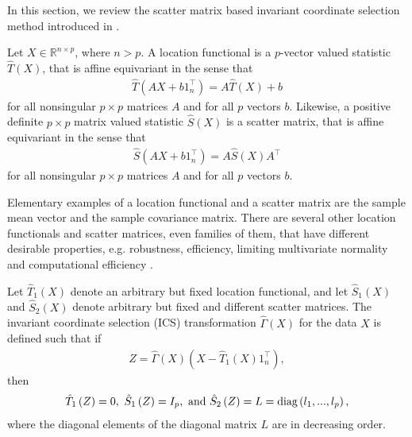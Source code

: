 \documentclass{llncs}
\begin{document}
In this section, we review the scatter matrix based invariant coordinate selection method introduced in \cite{TY}.


Let $X \in \mathbb{R}^{n\times p}$, where $n>p$. A location functional is a $p$-vector valued statistic $\hat{T}\left(X\right)$, that is affine equivariant in the sense that
\begin{align*}
\hat{T}\left(AX+b1_n^\top\right)=A\hat{T}\left(X\right)+b
\end{align*}
for all nonsingular $p\times p$ matrices $A$ and for all $p$ vectors
$b$.
Likewise, a  
positive definite $p\times p$ matrix valued statistic $\hat{S}\left(X\right)$ is a scatter matrix, that is affine
equivariant in the sense that
\begin{align*}
\hat{S}\left(AX+b1_n^\top\right)=A\hat{S}\left(X\right)A^\top
\end{align*}
for all nonsingular $p\times p$ matrices $A$ and for all $p$ vectors
$b$.



Elementary examples of a location functional and a scatter matrix are
the sample mean vector and the sample covariance matrix. There are several other location functionals and scatter matrices, even families of them, that have different desirable properties, e.g. robustness, efficiency, limiting multivariate normality and computational efficiency \cite{S3,S2,MMY}.





Let $\hat{T}_1\left(X\right)$ denote an arbitrary but fixed location functional, and let $\hat{S}_1\left(X\right)$ and $\hat{S}_2\left(X\right)$ denote  arbitrary but fixed and different scatter matrices. The invariant coordinate selection (ICS) transformation $\hat{\Gamma}\left(X\right)$ for the data $X$ is  defined such that if 
\begin{align*}
Z=\hat{\Gamma}\left(X\right)\left(X-\hat{T}_1\left(X\right)1_n^\top \right),
 \end{align*}
 then
\begin{align*}
\hat{T}_1\left(Z\right)=0, \  \hat{S}_1\left(Z\right)=I_p,  \ \mbox{and} \  \hat{S}_2\left(Z\right)=L=\textnormal{diag}\left(l_1, ..., l_p\right),
\end{align*}
where the diagonal elements of the diagonal matrix $L$ are in decreasing order.
\end{document}
